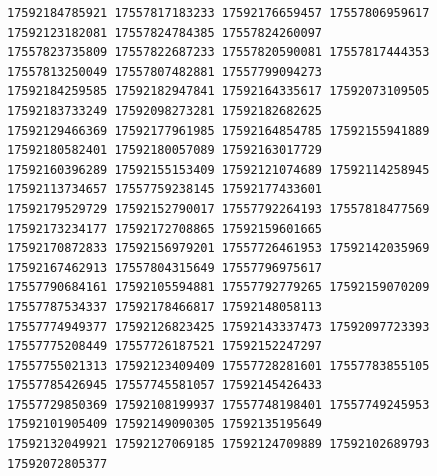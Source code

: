 \documentclass[9pt]{article}
\begin{document}
\begin{verbatim}
17592184785921 17557817183233 17592176659457 17557806959617 17592123182081 17557824784385 17557824260097
17557823735809 17557822687233 17557820590081 17557817444353 17557813250049 17557807482881 17557799094273
17592184259585 17592182947841 17592164335617 17592073109505 17592183733249 17592098273281 17592182682625
17592129466369 17592177961985 17592164854785 17592155941889 17592180582401 17592180057089 17592163017729
17592160396289 17592155153409 17592121074689 17592114258945 17592113734657 17557759238145 17592177433601
17592179529729 17592152790017 17557792264193 17557818477569 17592173234177 17592172708865 17592159601665
17592170872833 17592156979201 17557726461953 17592142035969 17592167462913 17557804315649 17557796975617
17557790684161 17592105594881 17557792779265 17592159070209 17557787534337 17592178466817 17592148058113
17557774949377 17592126823425 17592143337473 17592097723393 17557775208449 17557726187521 17592152247297
17557755021313 17592123409409 17557728281601 17557783855105 17557785426945 17557745581057 17592145426433
17557729850369 17592108199937 17557748198401 17557749245953 17592101905409 17592149090305 17592135195649
17592132049921 17592127069185 17592124709889 17592102689793 17592072805377
\end{verbatim}
\end{document}
